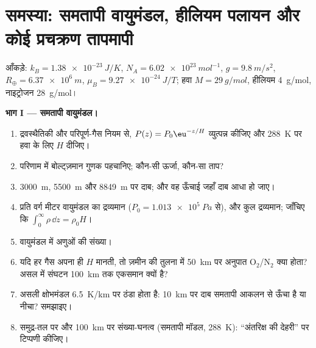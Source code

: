 \section{समस्या: समतापी वायुमंडल, हीलियम पलायन और कोई प्रचक्रण तापमापी}

\begin{problem}\label{pb:b2:boltzmann-factor:1}
आँकड़े: $k_B = \qty{1.38e-23}{J/K}$, $N_A = \qty{6.02e23}{mol^{-1}}$, $g =
\qty{9.8}{m/s^2}$, $R_{\oplus} = \qty{6.37e6}{m}$, $\mu_B = \qty{9.27e-24}{J/T}$;
हवा $M = \qty{29}{g/mol}$, हीलियम \qty{4}{g/mol}, नाइट्रोजन \qty{28}{g/mol}।

\textbf{भाग I --- समतापी वायुमंडल।}
\begin{enumerate}
  \item द्रवस्थैतिकी और परिपूर्ण-गैस नियम से, $P(z) =
        P_0\eu^{-z/H}$ व्युत्पन्न कीजिए और \qty{288}{K} पर हवा के लिए $H$ दीजिए।
  \item परिणाम में बोल्ट्ज़मान गुणक पहचानिए; कौन-सी ऊर्जा,
        कौन-सा ताप?
  \item \qty{3000}{m}, \qty{5500}{m} और \qty{8849}{m} पर दाब; और वह
        ऊँचाई जहाँ दाब आधा हो जाए।
  \item प्रति वर्ग मीटर वायुमंडल का द्रव्यमान ($P_0 =
        \qty{1.013e5}{Pa}$ से), और कुल द्रव्यमान; जाँचिए कि $\int_0^\infty
        \rho\,\dd z = \rho_0H$।
  \item वायुमंडल में अणुओं की संख्या।
  \item यदि हर गैस अपना ही $H$ मानती, तो ज़मीन की तुलना में
        \qty{50}{km} पर अनुपात O$_2$/N$_2$ क्या होता? असल में
        संघटन \qty{100}{km} तक एकसमान क्यों है?
  \item असली क्षोभमंडल \qty{6.5}{K/km} पर ठंडा होता है: \qty{10}{km} पर
        दाब समतापी आकलन से ऊँचा है या नीचा?
        समझाइए।
  \item समुद्र-तल पर और \qty{100}{km} पर संख्या-घनत्व (समतापी
        मॉडल, \qty{288}{K}): ``अंतरिक्ष की देहरी'' पर टिप्पणी कीजिए।
\end{enumerate}


\end{problem}
